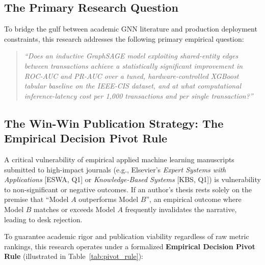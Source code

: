 \documentclass[11pt,a4paper]{article}
\begin{document}
\subsection{The Primary Research Question}
To bridge the gulf between academic GNN literature and production deployment constraints, this research addresses the following primary empirical question:
\begin{quote}
\textit{``Does an inductive GraphSAGE model exploiting shared-entity edges between transactions achieve a statistically significant improvement in ROC-AUC and PR-AUC over a tuned, hardware-controlled XGBoost tabular baseline on the IEEE-CIS dataset, and at what computational inference-latency cost per 1,000 transactions and per single transaction?''}
\end{quote}

\subsection{The Win-Win Publication Strategy: The Empirical Decision Pivot Rule}
A critical vulnerability of empirical applied machine learning manuscripts submitted to high-impact journals (e.g., Elsevier's \textit{Expert Systems with Applications} [ESWA, Q1] or \textit{Knowledge-Based Systems} [KBS, Q1]) is vulnerability to non-significant or negative outcomes. If an author's thesis rests solely on the premise that ``Model $A$ outperforms Model $B$'', an empirical outcome where Model $B$ matches or exceeds Model $A$ frequently invalidates the narrative, leading to desk rejection.

To guarantee academic rigor and publication viability regardless of raw metric rankings, this research operates under a formalized \textbf{Empirical Decision Pivot Rule} (illustrated in Table~\ref{tab:pivot_rule}):
\end{document}
